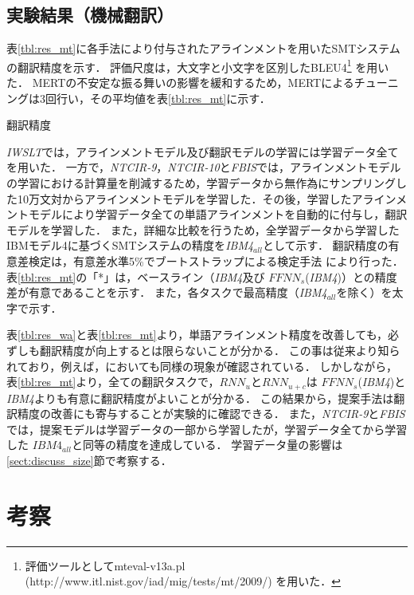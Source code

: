 \documentclass[japanese]{jnlp_1.4}
\begin{document}
\subsection{実験結果（機械翻訳）}
\label{sect:res_translation}

表\ref{tbl:res_mt}に各手法により付与されたアラインメントを用いたSMTシステムの翻訳精度を示す．
評価尺度は，大文字と小文字を区別したBLEU4\footnote{評価ツールとしてmteval-v13a.pl (http://www.itl.nist.gov/iad/mig/tests/mt/2009/) を用いた．} \cite{Papineni02}を用いた．
MERTの不安定な振る舞いの影響を緩和するため，MERTによるチューニングは3回行い，その平均値を表\ref{tbl:res_mt}に示す\cite{utiyama09}．

\begin{table}[b]
\caption{翻訳精度}
\label{tbl:res_mt}

\end{table}

{\it IWSLT}では，アラインメントモデル及び翻訳モデルの学習には学習データ全てを用いた．
一方で，{\it NTCIR-9}，{\it NTCIR-10}と{\it FBIS}では，アラインメントモデルの学習における計算量を削減するため，学習データから無作為にサンプリングした10万文対からアラインメントモデルを学習した．その後，学習したアラインメントモデルにより学習データ全ての単語アラインメントを自動的に付与し，翻訳モデルを学習した．
また，詳細な比較を行うため，全学習データから学習したIBMモデル4に基づくSMTシステムの精度を{\it IBM4$_{all}$}として示す．
翻訳精度の有意差検定は，有意差水準5\%でブートストラップによる検定手法\cite{koehn04} により行った．
表\ref{tbl:res_mt}の「*」は，ベースライン（{\it IBM4}及び $\mathit{FFNN}_{s}$({\it IBM4})）との精度差が有意であることを示す．
また，各タスクで最高精度（{\it IBM4$_{all}$}を除く）を太字で示す．

表\ref{tbl:res_wa}と表\ref{tbl:res_mt}より，単語アラインメント精度を改善しても，必ずしも翻訳精度が向上するとは限らないことが分かる．
この事は従来より知られており，例えば，\cite{yang13}においても同様の現象が確認されている．
しかしながら，表\ref{tbl:res_mt}より，全ての翻訳タスクで，$\mathit{RNN}_{u}$と$\mathit{RNN}_{u+c}$は $\mathit{FFNN}_{s}$({\it IBM4})と{\it IBM4}よりも有意に翻訳精度がよいことが分かる．
この結果から，提案手法は翻訳精度の改善にも寄与することが実験的に確認できる．
また，{\it NTCIR-9}と{\it FBIS}では，提案モデルは学習データの一部から学習したが，学習データ全てから学習した $\mathit{IBM4}_\mathit{all}$と同等の精度を達成している．
学習データ量の影響は\ref{sect:discuss_size}節で考察する．


\section{考察}
\label{sect:discuss}
\end{document}

